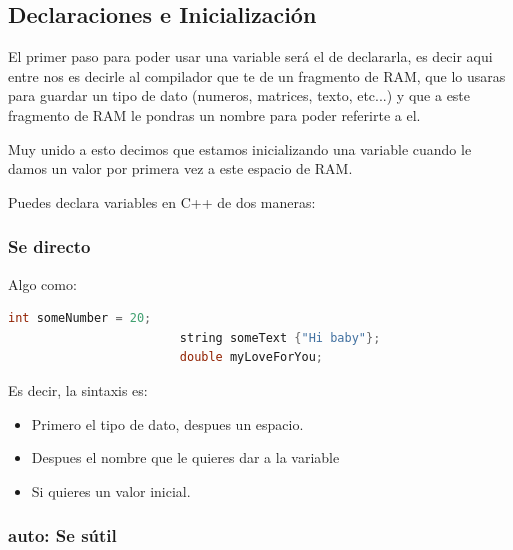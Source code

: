 \documentclass[12pt, fleqn]{report}                             %
\theoremstyle{break}                                            %
\begin{document}
            \subsection{Declaraciones e Inicialización}

                El primer paso para poder usar una variable será el de declararla, es decir
                aqui entre nos es decirle al compilador que te de un fragmento de RAM, que lo usaras
                para guardar un tipo de dato (numeros, matrices, texto, etc...) y que a este fragmento
                de RAM le pondras un nombre para poder referirte a el.

                Muy unido a esto decimos que estamos inicializando una variable cuando le damos
                un valor por primera vez a este espacio de RAM.

                Puedes declara variables en C++ de dos maneras:

                \subsubsection{Se directo}

                    Algo como:
                    \begin{lstlisting}[language=C++, gobble=24]
                        int someNumber = 20;
                        string someText {"Hi baby"};
                        double myLoveForYou;
                    \end{lstlisting}

                    Es decir, la sintaxis es:
                    \begin{itemize}
                        \item Primero el tipo de dato, despues un espacio.
                        \item Despues el nombre que le quieres dar a la variable
                        \item Si quieres un valor inicial.
                    \end{itemize} 

                \subsubsection{auto: Se sútil}
\end{document}
